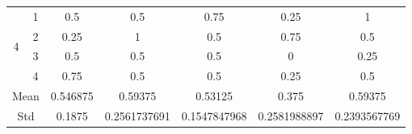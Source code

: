 \documentclass[draft,dvipsnames]{drexel-thesis}
\begin{document}
\begin{thesis}
\begin{table}[!t]
\begin{tabular}{|c|c|c|c|c|c|c|}
\multirow{4}{*}{4}    & 1                   & 0.5      & 0.5          & 0.75         & 0.25         & 1            \\ \cline{2-7} 
                      & 2                   & 0.25     & 1            & 0.5          & 0.75         & 0.5          \\ \cline{2-7} 
                      & 3                   & 0.5      & 0.5          & 0.5          & 0            & 0.25         \\ \cline{2-7} 
                      & 4                   & 0.75     & 0.5          & 0.5          & 0.25         & 0.5          \\ \hline
\multicolumn{2}{|c|}{Mean}                  & 0.546875 & 0.59375      & 0.53125      & 0.375        & 0.59375      \\ \hline
\multicolumn{2}{|c|}{Std}                   & 0.1875   & 0.2561737691 & 0.1547847968 & 0.2581988897 & 0.2393567769 \\ \hline
\end{tabular}
\end{table}


\end{thesis}
\end{document}
